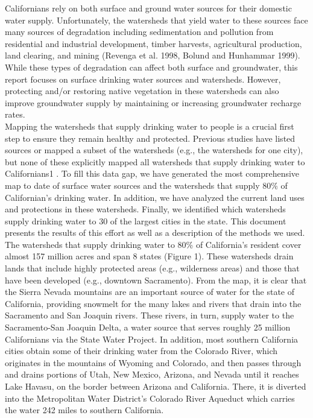 \documentclass{article}
\begin{document}
Californians rely on both surface and ground water sources for their domestic water supply.
Unfortunately, the watersheds that yield water to these sources face many sources of
degradation including sedimentation and pollution from residential and industrial
development, timber harvests, agricultural production, land clearing, and mining (Revenga et al.
1998, Bolund and Hunhammar 1999). While these types of degradation can affect both surface
and groundwater, this report focuses on surface drinking water sources and watersheds.
However, protecting and/or restoring native vegetation in these watersheds can also improve
groundwater supply by maintaining or increasing groundwater recharge rates.\\
Mapping the watersheds that supply drinking water to people is a crucial first step to ensure
they remain healthy and protected. Previous studies have listed sources or mapped a subset of
the watersheds (e.g., the watersheds for one city), but none of these explicitly mapped all
watersheds that supply drinking water to Californians1
. To fill this data gap, we have generated
the most comprehensive map to date of surface water sources and the watersheds that supply
80\% of Californian’s drinking water. In addition, we have analyzed the current land uses and
protections in these watersheds. Finally, we identified which watersheds supply drinking water
to 30 of the largest cities in the state. This document presents the results of this effort as well
as a description of the methods we used.\\

The watersheds that supply drinking water to 80\% of California’s resident cover almost 157 million acres and span 8 states (Figure 1). These watersheds drain lands that include highly protected areas (e.g., wilderness areas) and those that have been developed (e.g., downtown Sacramento). From the map, it is clear that the Sierra Nevada mountains are an important source of water for the state of California, providing snowmelt for the many lakes and rivers that drain into the Sacramento and San Joaquin rivers. These rivers, in turn, supply water to the Sacramento-San Joaquin Delta, a water source that serves roughly 25 million Californians via the State Water Project. In addition, most southern California cities obtain some of their drinking water from the Colorado River, which originates in the mountains of Wyoming and Colorado, and then passes through and drains portions of Utah, New Mexico, Arizona, and Nevada until it reaches Lake Havasu, on the border between Arizona and California. There, it is diverted into the Metropolitan Water District’s Colorado River Aqueduct which carries the
water 242 miles to southern California. \\
\end{document}
